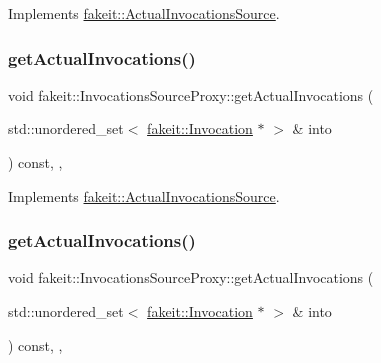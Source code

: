Implements \mbox{\hyperlink{structfakeit_1_1ActualInvocationsSource_a274de522e11e1f9b8d70c6e0be9e5a9b}{fakeit\+::\+Actual\+Invocations\+Source}}.

\mbox{\label{structfakeit_1_1InvocationsSourceProxy_af06b5d62b0c4ff1e3048fae5d7ddd8c3}} 
\subsubsection{\texorpdfstring{getActualInvocations()}{getActualInvocations()}\hspace{0.1cm}{\footnotesize\ttfamily [7/9]}}
{\footnotesize\ttfamily void fakeit\+::\+Invocations\+Source\+Proxy\+::get\+Actual\+Invocations (\begin{DoxyParamCaption}\item[{std\+::unordered\+\_\+set$<$ \mbox{\hyperlink{structfakeit_1_1Invocation}{fakeit\+::\+Invocation}} $\ast$ $>$ \&}]{into }\end{DoxyParamCaption}) const\hspace{0.3cm}{\ttfamily [inline]}, {\ttfamily [override]}, {\ttfamily [virtual]}}



Implements \mbox{\hyperlink{structfakeit_1_1ActualInvocationsSource_a274de522e11e1f9b8d70c6e0be9e5a9b}{fakeit\+::\+Actual\+Invocations\+Source}}.

\mbox{\label{structfakeit_1_1InvocationsSourceProxy_af06b5d62b0c4ff1e3048fae5d7ddd8c3}} 
\subsubsection{\texorpdfstring{getActualInvocations()}{getActualInvocations()}\hspace{0.1cm}{\footnotesize\ttfamily [8/9]}}
{\footnotesize\ttfamily void fakeit\+::\+Invocations\+Source\+Proxy\+::get\+Actual\+Invocations (\begin{DoxyParamCaption}\item[{std\+::unordered\+\_\+set$<$ \mbox{\hyperlink{structfakeit_1_1Invocation}{fakeit\+::\+Invocation}} $\ast$ $>$ \&}]{into }\end{DoxyParamCaption}) const\hspace{0.3cm}{\ttfamily [inline]}, {\ttfamily [override]}, {\ttfamily [virtual]}}



